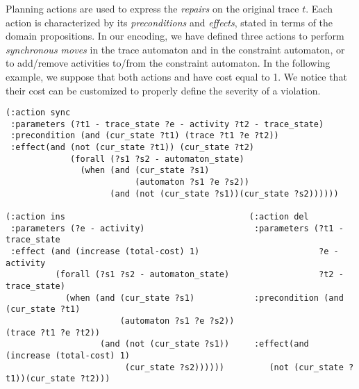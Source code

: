 Planning actions are used to express the \emph{repairs} on the original trace $t$. Each action is characterized by its \emph{preconditions} and \emph{effects}, stated in terms of the domain propositions. In our encoding, we have defined three actions to perform \emph{synchronous moves} in the trace automaton and in the constraint automaton, or to add/remove activities to/from the constraint automaton. In the following example, we suppose that both actions  and  have cost equal to 1. We notice that their cost can be customized to properly define the severity of a violation.
%

\begin{scriptsize}
\begin{verbatim}
(:action sync
 :parameters (?t1 - trace_state ?e - activity ?t2 - trace_state)
 :precondition (and (cur_state ?t1) (trace ?t1 ?e ?t2))
 :effect(and (not (cur_state ?t1)) (cur_state ?t2)
             (forall (?s1 ?s2 - automaton_state)
               (when (and (cur_state ?s1)
                          (automaton ?s1 ?e ?s2))
                     (and (not (cur_state ?s1))(cur_state ?s2))))))

(:action ins                                     (:action del
 :parameters (?e - activity)                      :parameters (?t1 - trace_state
 :effect (and (increase (total-cost) 1)                        ?e - activity
          (forall (?s1 ?s2 - automaton_state)                  ?t2 - trace_state)
            (when (and (cur_state ?s1)            :precondition (and (cur_state ?t1)
                       (automaton ?s1 ?e ?s2))                     (trace ?t1 ?e ?t2))
                   (and (not (cur_state ?s1))     :effect(and (increase (total-cost) 1)
                        (cur_state ?s2))))))         (not (cur_state ?t1))(cur_state ?t2)))
\end{verbatim}
\end{scriptsize}
\smallskip

